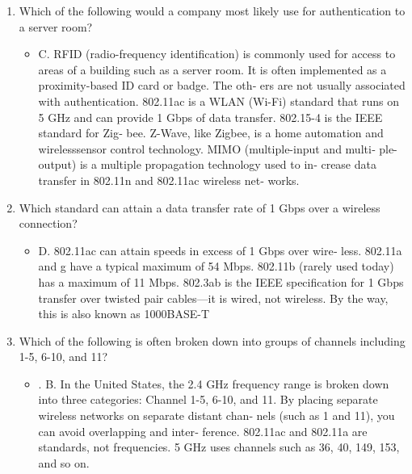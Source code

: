 \documentclass{article}
\begin{document}
\begin{enumerate}
    \item Which of the following would a company most likely use for
authentication to a server room?
    \begin{itemize}
        \item C. RFID (radio-frequency identification) is commonly used for
access to areas of a building such as a server room. It is often
implemented as a proximity-based ID card or badge. The oth‐
ers are not usually associated with authentication. 802.11ac is
a WLAN (Wi-Fi) standard that runs on 5 GHz and can provide
1 Gbps of data transfer. 802.15-4 is the IEEE standard for Zig‐
bee. Z-Wave, like Zigbee, is a home automation and wirelesssensor control technology. MIMO (multiple-input and multi‐
ple-output) is a multiple propagation technology used to in‐
crease data transfer in 802.11n and 802.11ac wireless net‐
works.
    \end{itemize}
    \item Which standard can attain a data transfer rate of 1 Gbps over a
wireless connection?
    \begin{itemize}
        \item D. 802.11ac can attain speeds in excess of 1 Gbps over wire‐
less. 802.11a and g have a typical maximum of 54 Mbps.
802.11b (rarely used today) has a maximum of 11 Mbps.
802.3ab is the IEEE specification for 1 Gbps transfer over
twisted pair cables—it is wired, not wireless. By the way, this
is also known as 1000BASE-T
    \end{itemize}
    \item Which of the following is often broken down into groups of
channels including 1-5, 6-10, and 11?
    \begin{itemize}
        \item . B. In the United States, the 2.4 GHz frequency range is broken
down into three categories: Channel 1-5, 6-10, and 11. By
placing separate wireless networks on separate distant chan‐
nels (such as 1 and 11), you can avoid overlapping and inter‐
ference. 802.11ac and 802.11a are standards, not frequencies.
5 GHz uses channels such as 36, 40, 149, 153, and so on.
    \end{itemize}
   
\end{enumerate}
\end{document}
